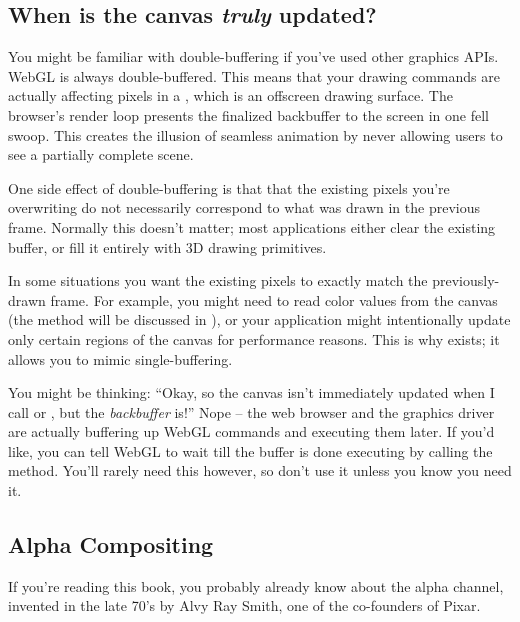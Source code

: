 \subsection{When is the canvas \emph{truly} updated?}
\label{sec:doublebuffer}

You might be familiar with  double-buffering if you've used other graphics APIs.  WebGL is always double-buffered.  This means that your drawing commands are actually affecting pixels in a  , which is an offscreen drawing surface.  The browser's render loop presents the finalized backbuffer to the screen in one fell swoop.  This creates the illusion of seamless animation by never allowing users to see a partially complete scene.

One side effect of double-buffering is that that the existing pixels you're overwriting do not necessarily correspond to what was drawn in the previous frame.  Normally this doesn't matter; most applications either clear the existing buffer, or fill it entirely with 3D drawing primitives.

In some situations you want the existing pixels to exactly match the previously-drawn frame.  For example, you might need to read color values from the canvas (the   method will be discussed in ), or your application might intentionally update only certain regions of the canvas for performance reasons.  This is why  exists; it allows you to mimic  single-buffering.

You might be thinking: ``Okay, so the canvas isn't immediately updated when I call  or , but the \emph{backbuffer} is!''  Nope -- the web browser and the graphics driver are actually buffering up WebGL commands and executing them later.  If you'd like, you can tell WebGL to wait till the buffer is done executing by calling the   method.  You'll rarely need this however, so don't use it unless you know you need it.

\subsection{Alpha Compositing}

If you're reading this book, you probably already know about the alpha channel, invented in the late 70's by Alvy Ray Smith, one of the co-founders of Pixar.

